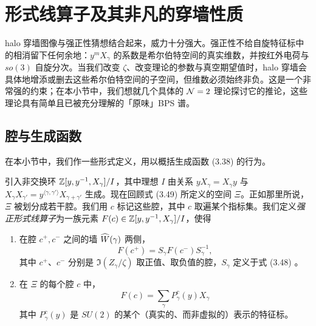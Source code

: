 

\section{形式线算子及其非凡的穿墙性质}\label{sec:Formal-line-operators}

halo 穿墙图像与强正性猜想结合起来，威力十分强大。强正性不给自旋特征标中的相消留下任何余地：$y^m X_\gamma$ 的系数是希尔伯特空间的真实维数，并按红外电荷与 $so(3)$ 自旋分次。当我们改变 $\zeta$、改变理论的参数与真空期望值时，halo 穿墙会具体地增添或删去这些希尔伯特空间的子空间，但维数必须始终非负。这是一个非常强的约束；在本小节中，我们想就几个具体的 $\mathcal{N}=2$ 理论探讨它的推论，这些理论具有简单且已被充分理解的「原味」BPS 谱。

\subsection{腔与生成函数}\label{subsec:Chambers}

在本小节中，我们作一些形式定义，用以概括生成函数 (3.38)%
的行为。

引入非交换环 $\mathbb{Z}[y,y^{-1},X_\gamma]/I$，其中理想 $I$ 由关系 $yX_\gamma = X_\gamma y$ 与 $X_\gamma X_{\gamma'} = y^{\langle\gamma,\gamma'\rangle}X_{\gamma+\gamma'}$ 生成。现在回顾式 (3.49)%
所定义的空间 $\Xi$。正如那里所说，$\Xi$ 被划分成若干腔。我们用 $c$ 标记这些腔，其中 $c$ 取遍某个指标集。我们定义\emph{强正形式线算子}为一族元素 $F(c)\in\mathbb{Z}[y,y^{-1},X_\gamma]/I$，使得

\begin{enumerate}

\item 在腔 $c^+,c^-$ 之间的墙 $\widehat W(\gamma)$ 两侧，
\begin{equation}
F(c^+) = S_\gamma F(c^-) S_\gamma^{-1},
\end{equation}
其中 $c^+$、$c^-$ 分别是 $\Im(Z_\gamma/\zeta)$ 取正值、取负值的腔，$S_\gamma$ 定义于式 (3.48)%
。

\item 在 $\Xi$ 的每个腔 $c$ 中，
\begin{equation}\label{eq:finite-positive-sum}
F(c) = \sum_\gamma P^c_\gamma(y) X_\gamma
\end{equation}
其中 $P^c_\gamma(y)$ 是 $SU(2)$ 的某个（真实的、而非虚拟的）表示的特征标。

\end{enumerate}

